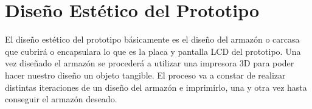 \section{Diseño Estético del Prototipo}

\par 
El diseño estético del prototipo básicamente es el diseño del armazón o carcasa que cubrirá o encapsulara lo que es la placa y pantalla LCD del prototipo. Una vez diseñado el armazón se procederá a utilizar una impresora 3D para poder hacer nuestro diseño un objeto tangible. El proceso va a constar de realizar distintas iteraciones de un diseño del armazón e imprimirlo, una y otra vez hasta conseguir el armazón deseado. 


